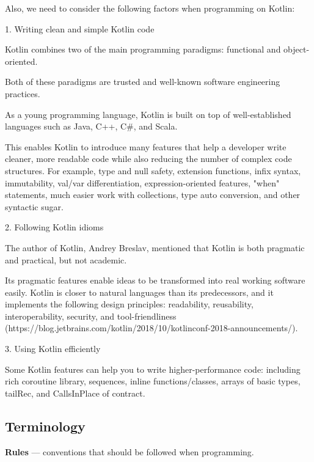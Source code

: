 Also, we need to consider the following factors when programming on Kotlin:



1. Writing clean and simple Kotlin code



    Kotlin combines two of the main programming paradigms: functional and object-oriented.

    Both of these paradigms are trusted and well-known software engineering practices.

    As a young programming language, Kotlin is built on top of well-established languages such as Java, C++, C\#, and Scala.

    This enables Kotlin to introduce many features that help a developer write cleaner, more readable code while also reducing the number of complex code structures. For example, type and null safety, extension functions, infix syntax, immutability, val/var differentiation, expression-oriented features, "when" statements, much easier work with collections, type auto conversion, and other syntactic sugar.



2. Following Kotlin idioms



    The author of Kotlin, Andrey Breslav, mentioned that Kotlin is both pragmatic and practical, but not academic. 

    Its pragmatic features enable ideas to be transformed into real working software easily. Kotlin is closer to natural languages than its predecessors, and it implements the following design principles: readability, reusability, interoperability, security, and tool-friendliness (https://blog.jetbrains.com/kotlin/2018/10/kotlinconf-2018-announcements/).



3. Using Kotlin efficiently



    Some Kotlin features can help you to write higher-performance code: including rich coroutine library, sequences, inline functions/classes, arrays of basic types, tailRec, and CallsInPlace of contract.



\subsection*{\textbf{Terminology}}




\textbf{Rules} — conventions that should be followed when programming.



